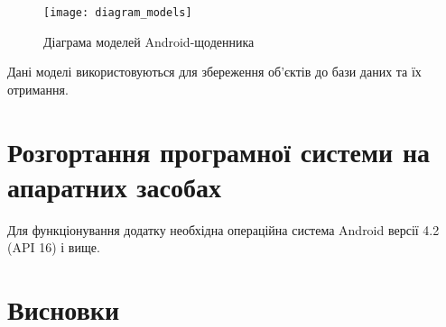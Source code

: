 \documentclass[../main.tex]{subfiles}
\begin{document}
\begin{figure}[H]
	\centering
	\texttt{[image: diagram\_models]}
	\caption{Діаграма моделей Android-щоденника}
	\label{diagram:3.3}
\end{figure}

Дані моделі використовуються для збереження об'єктів до бази даних та їх отримання.


\section{Розгортання програмної системи на апаратних засобах}

Для функціонування додатку необхідна операційна система Android версії 4.2 (API 16) і вище.


\section{Висновки}

\end{document}
